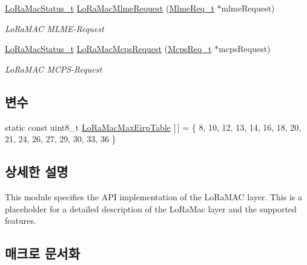 \begin{DoxyCompactItemize}
\mbox{\hyperlink{group___l_o_r_a_m_a_c_ga30bd25657e10480f8605ee951b0ecfbd}{Lo\+Ra\+Mac\+Status\+\_\+t}} \mbox{\hyperlink{group___l_o_r_a_m_a_c_ga097113f30feecc17c780940ff74af33e}{Lo\+Ra\+Mac\+Mlme\+Request}} (\mbox{\hyperlink{group___l_o_r_a_m_a_c_ga5a32f5920a7a3d04435c142be7f38b19}{Mlme\+Req\+\_\+t}} $\ast$mlme\+Request)
\begin{DoxyCompactList}\small\item\em Lo\+Ra\+M\+AC M\+L\+M\+E-\/\+Request \end{DoxyCompactList}\item 
\mbox{\hyperlink{group___l_o_r_a_m_a_c_ga30bd25657e10480f8605ee951b0ecfbd}{Lo\+Ra\+Mac\+Status\+\_\+t}} \mbox{\hyperlink{group___l_o_r_a_m_a_c_ga79768f8a3c22aaff84d4dfcc77ad508c}{Lo\+Ra\+Mac\+Mcps\+Request}} (\mbox{\hyperlink{group___l_o_r_a_m_a_c_ga038e0fe5eecc1fc4e8165eace8e2e683}{Mcps\+Req\+\_\+t}} $\ast$mcps\+Request)
\begin{DoxyCompactList}\small\item\em Lo\+Ra\+M\+AC M\+C\+P\+S-\/\+Request \end{DoxyCompactList}\end{DoxyCompactItemize}
\subsection*{변수}
\begin{DoxyCompactItemize}
\item 
static const uint8\+\_\+t \mbox{\hyperlink{group___l_o_r_a_m_a_c_ga981ec467711a94cacf1a8bc4b88735ba}{Lo\+Ra\+Mac\+Max\+Eirp\+Table}} \mbox{[}$\,$\mbox{]} = \{ 8, 10, 12, 13, 14, 16, 18, 20, 21, 24, 26, 27, 29, 30, 33, 36 \}
\end{DoxyCompactItemize}


\subsection{상세한 설명}
This module specifies the A\+PI implementation of the Lo\+Ra\+M\+AC layer. This is a placeholder for a detailed description of the Lo\+Ra\+Mac layer and the supported features. 

\subsection{매크로 문서화}
\mbox{\label{group___l_o_r_a_m_a_c_ga801525db3ba12b250029f026403524b7}} 
